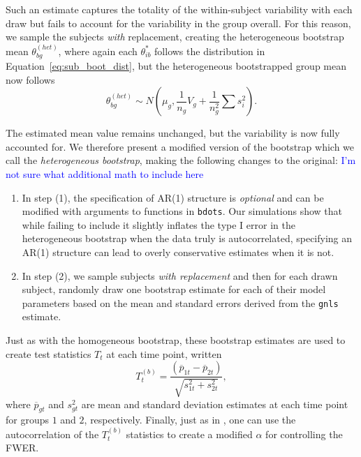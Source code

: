 \documentclass{article}
\newcommand{\xt}{\texttt}
\providecommand{\cn}[1]{\textcolor{blue}{#1}}
\begin{document}
Such an estimate captures the totality of the within-subject variability with each draw but fails to account for the variability in the group overall. For this reason, we sample the subjects \textit{with} replacement, creating the heterogeneous bootstrap mean $\theta_{bg}^{(het)}$, where again each $\theta_{ib}^*$ follows the distribution in Equation~\ref{eq:sub_boot_dist}, but the heterogeneous bootstrapped group mean now follows
\begin{equation}\label{eq:w_rep_boot}
\theta_{bg}^{(het)} \sim N \left( \mu_{g}, \frac{1}{n_g} V_{g} + \frac{1}{n_g^2} \sum s_i^2 \right).
\end{equation}


The estimated mean value remains unchanged, but the variability is now fully accounted for. We therefore present a modified version of the bootstrap which we call the \textit{heterogeneous bootstrap}, making the following changes to the original:  \cn{I'm not sure what additional math to include here}

\begin{enumerate}
\item In step (1), the specification of AR(1) structure is \textit{optional} and can be modified with arguments to functions in \xt{bdots}. Our simulations show that while failing to include it slightly inflates the type I error in the heterogeneous bootstrap when the data truly is autocorrelated, specifying an AR(1) structure can lead to overly conservative estimates when it is not.
\item In step (2), we sample subjects \textit{with replacement} and then for each drawn subject, randomly draw one bootstrap estimate for each of their model parameters based on the mean and standard errors derived from the \xt{gnls} estimate.
\end{enumerate}

Just as with the homogeneous bootstrap, these bootstrap estimates are used to create test statistics $T_t$ at each time point, written
\begin{equation}
T_t^{(b)} = \frac{(\overline{p}_{1t} - \overline{p}_{2t})}{\sqrt{s_{1t}^2 + s_{2t}^2}},
\end{equation}
where $\overline{p}_{gt}$ and $s_{gt}^2$ are mean and standard deviation estimates at each time point for groups $1$ and $2$, respectively. Finally, just as in \citet{oleson2017detecting}, one can use the autocorrelation of the $T_t^{(b)}$ statistics to create a modified $\alpha$ for controlling the FWER.
\end{document}
